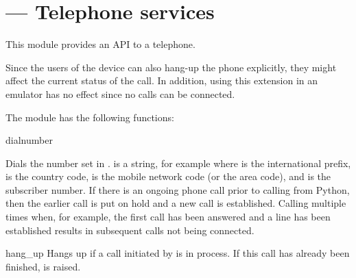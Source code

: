 %
%
%

\section{ ---
	 Telephone services}
\label{sec:telephone}


This module provides an API to a telephone. 

Since the users of the device can also hang-up the phone explicitly, they 
might affect the current status of the call. In addition, using this 
extension in an emulator has no effect since no calls can be connected.

The  module has the following functions:

\begin{funcdesc}{dial}{number}

Dials the number set in .  
is a string, for example  where  is the 
international prefix,  is the country code,  is 
the mobile network code (or the area code), and  is the 
subscriber number. If there is an ongoing phone call prior to calling 
 from Python, then the earlier call is put on hold and a new 
call is established. Calling  multiple times when, for example, 
the first call has been answered and a line has been established results in 
subsequent calls not being connected.
\end{funcdesc}

\begin{funcdesc}{hang\_up}{}
Hangs up if a call initiated by  is in process. If this call 
has already been finished,  is raised.
\end{funcdesc}
